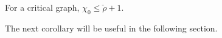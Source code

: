For a critical graph, $\chi_0 \leq \check{\rho} + 1$.

The next corollary will be useful in the following section.
